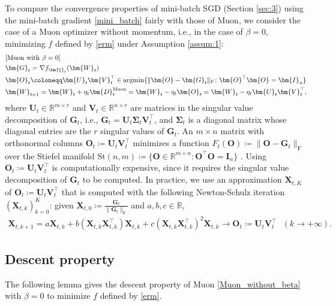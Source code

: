 \documentclass[twoside,11pt]{article}
\newcommand{\argmin}{\operatornamewithlimits{argmin}}
\begin{document}
To compare the convergence properties of mini-batch SGD (Section \ref{sec:3}) using the mini-batch gradient \eqref{mini_batch} fairly with those of Muon, we consider the case of a Muon optimizer without momentum, i.e., in the case of $\beta = 0$, minimizing $f$ defined by \eqref{erm} under Assumption \ref{assum:1}:
\begin{align}\label{Muon_without_beta}
\begin{split}
&\text{[Muon with $\beta = 0$]}\\
&\bm{G}_t = \nabla f_{\bm{\xi}_t} (\bm{W}_t)\\
&\bm{O}_t \coloneqq \bm{U}_t \bm{V}_t^\top \in \argmin \{ \| \bm{O} - \bm{G}_t \|_{\mathrm{F}} \colon \bm{O}^\top \bm{O} = \bm{I}_n  \} \\
&\bm{W}_{t+1} 
= \bm{W}_t + \eta_t \bm{D}_t^{\mathrm{Muon}}
= \bm{W}_t - \eta_t \bm{O}_t = \bm{W}_t - \eta_t \bm{U}_t \bm{V}_t^\top,
\end{split}
\end{align}
where $\bm{U}_t \in \mathbb{R}^{m \times r}$ and $\bm{V}_t \in \mathbb{R}^{n \times r}$ are matrices in the singular value decomposition of $\bm{G}_t$, i.e., $\bm{G}_t = \bm{U}_t \bm{\Sigma}_t \bm{V}_t^\top$, and $\bm{\Sigma}_t$ is a diagonal matrix whose diagonal entries are the $r$ singular values of $\bm{G}_t$. An $m \times n$ matrix with orthonormal columns $\bm{O}_t \coloneqq \bm{U}_t \bm{V}_t^\top$ minimizes a function $F_t(\bm{O}) \coloneqq \|\bm{O} - \bm{G}_t \|_{\mathrm{F}}$ over the Stiefel manifold $\mathrm{St}(n,m) \coloneqq \{ \bm{O} \in \mathbb{R}^{m \times n} \colon \bm{O}^\top \bm{O} = \bm{I}_n \}$ \citep[Proposition 4]{bernstein_newhouse_2024_oldoptimizer}. Using $\bm{O}_t \coloneqq \bm{U}_t \bm{V}_t^\top$ is computationally expensive, since it requires the singular value decomposition of $\bm{G}_t$ to be computed. In practice, we use an approximation $\bm{X}_{t,K}$ of $\bm{O}_t \coloneqq \bm{U}_t \bm{V}_t^\top$ that is computed with the following Newton-Schulz iteration $(\bm{X}_{t,k})_{k=0}^K$: 
given $\bm{X}_{t,0} \coloneqq \frac{\bm{G}_t}{\| \bm{G}_t \|_{\mathrm{F}}}$ and $a,b,c \in \mathbb{R}$,
\begin{align*}
\bm{X}_{t, k+1} = a \bm{X}_{t,k} + b \left( \bm{X}_{t,k} \bm{X}_{t,k}^\top \right) \bm{X}_{t,k} + c \left(\bm{X}_{t,k} \bm{X}_{t,k}^\top \right)^2 \bm{X}_{t,k} \to \bm{O}_t \coloneqq \bm{U}_t \bm{V}_t^\top \text{ } (k \to + \infty).
\end{align*}

\subsection{Descent property}
The following lemma gives the descent property of Muon \eqref{Muon_without_beta} with $\beta = 0$ to minimize $f$ defined by \eqref{erm}. 
\end{document}

